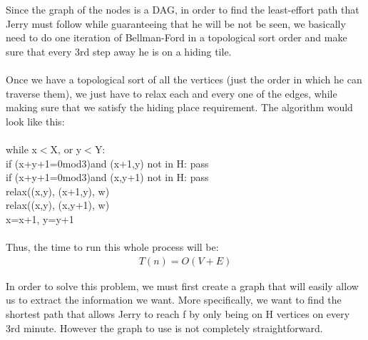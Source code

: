 \documentclass[12pt,twoside]{article}
\begin{document}
\begin{problems}
\begin{problemparts}
\problempart 
Since the graph of the nodes is a DAG, in order to find the least-effort path that Jerry must follow while guaranteeing that he will be not be seen, we basically need to do one iteration of Bellman-Ford in a topological sort order and make sure that every 3rd step away he is on a hiding tile. 
\\\\
Once we have a topological sort of all the vertices (just the order in which he can traverse them), we just have to relax each and every one of the edges, while making sure that we satisfy the hiding place requirement.
The algorithm would look like this:
\\\\
while x$<$X, or y$<$Y: \\
if (x+y+1=0mod3)and (x+1,y) not in H: pass \\
if (x+y+1=0mod3)and (x,y+1) not in H: pass \\
relax((x,y), (x+1,y), w)\\
relax((x,y), (x,y+1), w)\\
x=x+1, y=y+1
\\\\
 Thus, the time to run this whole process will be: 
\begin{align*}
T(n)=O(V+E)
\end{align*}

\problempart
In order to solve this problem, we must first create a graph that will easily allow us to extract the information we want. More specifically, we want to find the shortest path that allows Jerry to reach f by only being on H vertices on every 3rd minute. However the graph to use is not completely straightforward.


\end{problemparts}
\end{problems}
\end{document}
